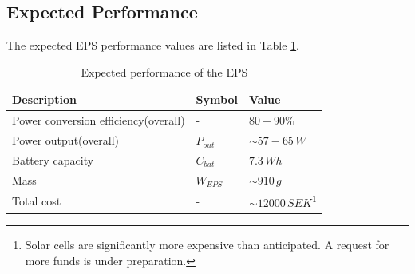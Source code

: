 \subsection{Expected Performance}
The expected \ac{EPS} performance values are listed in Table \ref{tab:expected_performance}.
%
\begin{table}[H]
\centering
\caption{Expected performance of the \ac{EPS}}
\label{tab:expected_performance}
\begin{minipage}{\textwidth}
\begin{tabular}{p{}p{}p{}}
\hline
\textbf{Description} & \textbf{Symbol} & \textbf{Value}\\
\hline
Power conversion efficiency(overall) & - & $80-90\%$\\
Power output(overall) & $P_{out}$ & $\sim 57-65\,W$\\
Battery capacity & $C_{bat}$ & $7.3\,Wh$\\
Mass & $W_{EPS}$ & $\sim910\,g$\\
Total cost & - & $\sim12000\,SEK$\footnote{Solar cells are significantly more expensive than anticipated. A request for more funds is under preparation.}\\
\hline
\end{tabular}\par
\vspace{-0.75\skip\footins}
\renewcommand{\footnoterule}{}
\end{minipage}
\end{table}